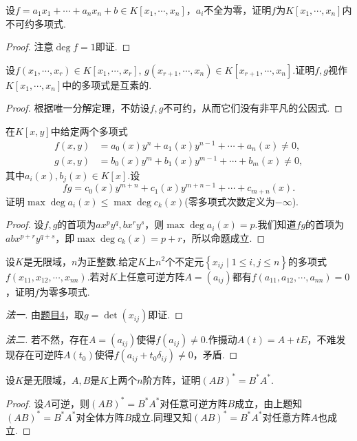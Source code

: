 \begin{prob}[7]
	设$f=a_1x_1+\cdots+a_nx_n+b\in K[x_1,\cdots,x_n]$，$a_i$不全为零，证明$f$为$K[x_1,\cdots,x_n]$内不可约多项式.
\end{prob}
\begin{proof}
	注意$\deg f=1$即证.
\end{proof}
\begin{prob}[8]
	设$f(x_1,\cdots,x_r)\in K[x_1,\cdots,x_r],\,g(x_{r+1},\cdots,x_n)\in K[x_{r+1},\cdots,x_n]$.证明$f,g$视作$K[x_1,\cdots,x_n]$中的多项式是互素的.
\end{prob}
\begin{proof}
	根据唯一分解定理，不妨设$f,g$不可约，从而它们没有非平凡的公因式.
\end{proof}
\begin{prob}[9]
	在$K[x,y]$中给定两个多项式
	\begin{align*}
		f(x,y) & =a_0(x)y^n+a_1(x)y^{n-1}+\cdots+a_n(x)\ne 0, \\
		g(x,y) & =b_0(x)y^m+b_1(x)y^{m-1}+\cdots+b_m(x)\ne 0,
	\end{align*}
	其中$a_i(x),b_j(x)\in K[x]$.设
	\[
		fg=c_0(x)y^{m+n}+c_1(x)y^{m+n-1}+\cdots+c_{m+n}(x).
	\]
	证明$\max\deg a_i(x)\le\max\deg c_k(x)$(零多项式次数定义为$-\infty$).
\end{prob}
\begin{proof}
	设$f,g$的首项为$ax^py^q,bx^ry^s$，则$\max\deg a_i(x)=p$.我们知道$fg$的首项为$abx^{p+r}y^{q+s}$，即$\max\deg c_k(x)=p+r$，所以命题成立.
\end{proof}
\begin{prob}[11]
	设$K$是无限域，$n$为正整数.给定$K$上$n^2$个不定元$\left\{x_{ij}\mid 1\le i,j\le n\right\}$的多项式$f(x_{11},x_{12},\cdots,x_{nn})$.若对$K$上任意可逆方阵$A=(a_{ij})$都有$f(a_{11},a_{12},\cdots,a_{nn})=0$，证明$f$为零多项式.
\end{prob}
\begin{proof}[法一]
	由\hyperlink{ZeroPolynomialCriterion}{题目4}，取$g=\det(x_{ij})$即证.
\end{proof}
\begin{proof}[法二]
	若不然，存在$A=(a_{ij})$使得$f(a_{ij})\ne 0$.作摄动$A(t)=A+tE$，不难发现存在可逆阵$A(t_0)$使得$f(a_{ij}+t_0\delta_{ij})\ne 0$，矛盾.
\end{proof}
\begin{prob}[12]
	设$K$是无限域，$A,B$是$K$上两个$n$阶方阵，证明$(AB)^*=B^*A^*$.
\end{prob}
\begin{proof}
	设$A$可逆，则$(AB)^*=B^*A^*$对任意可逆方阵$B$成立，由上题知$(AB)^*=B^*A^*$对全体方阵$B$成立.同理又知$(AB)^*=B^*A^*$对任意方阵$A$也成立.
\end{proof}
